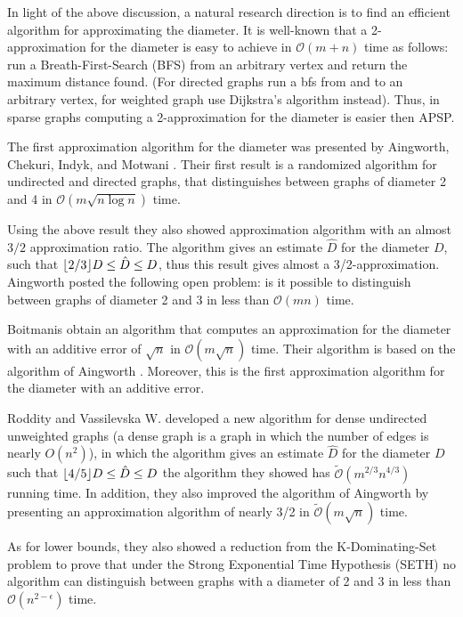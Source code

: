 In light of the above discussion, a natural research direction is to find an efficient algorithm for approximating the diameter.  It is well-known that a 2-approximation for the diameter is easy to achieve in $\mathcal{O}(m + n)$ time as follows: run a Breath-First-Search (BFS) from an arbitrary vertex and return the maximum distance found. (For directed graphs run a bfs from and to an arbitrary vertex, for weighted graph use Dijkstra's algorithm \cite{D59} instead). Thus, in sparse graphs computing a 2-approximation for the diameter is easier then APSP.

The first approximation algorithm for the diameter was presented by Aingworth, Chekuri, Indyk, and Motwani \cite{siam1999}. Their first result is a randomized algorithm for undirected and directed graphs, that distinguishes between graphs of diameter 2 and 4 in $\mathcal{O}(m \sqrt{n\log n})$ time.

Using the above result they also showed approximation algorithm with an almost $3/2$ approximation ratio. The algorithm gives an estimate $\hat{D}$ for the diameter $D$, such that $\lfloor 2/3 \rfloor D \leq \hat{D} \leq D$, thus this result gives almost a 3/2-approximation. Aingworth \etal posted the following open problem: is it possible to distinguish between graphs of diameter 2 and 3 in less than $\mathcal{O}(mn)$ time.

Boitmanis \etal \cite{KK06} obtain an algorithm that computes an approximation for the diameter with an additive error of $\sqrt{n}$ in $\mathcal{O}(m\sqrt{n})$ time. Their algorithm is based on the algorithm of Aingworth \etal. Moreover, this is the first approximation algorithm for the diameter with an additive error. 

Roddity and Vassilevska W. developed  \cite{LV2013} a new algorithm for dense undirected unweighted graphs (a dense graph is a graph in which the number of edges is nearly $O(n^2)$), in which the algorithm gives an estimate $\hat{D}$ for the diameter $D$ such that $\lfloor 4/5 \rfloor D \leq \hat{D} \leq D$ the algorithm they showed has $\mathcal{\tilde{O}}(m^{2/3}n^{4/3})$ running time. In addition, they also improved the algorithm of Aingworth \etal by presenting an approximation algorithm of nearly 3/2 in $\mathcal{\tilde{O}}(m\sqrt{n})$ time.

As for lower bounds, they also showed a reduction from the K-Dominating-Set problem to prove that under the Strong Exponential Time Hypothesis (SETH) no algorithm can distinguish between graphs with a diameter of 2 and  3 in less than $\mathcal{O}(n^{2-\epsilon})$ time. 

